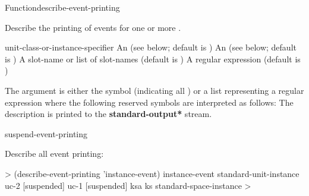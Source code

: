 \documentclass[10pt,twoside,english,pdftex]{article}
\begin{document}

\begin{functiondoc}{Function}{describe-event-printing}%
  {\nobr{[\var{event-class-specifier\/}}
    \nobr{[\var{unit-class-or-instance-specifier\/}]]}
    }
%
%


\fnsyntax

\fnpurpose Describe the printing of events for one or more
. 

\fnpackage {}

\fnmodule {}

\fnargs
\begin{args}{unit-class-or-instance-specifier}
 An  
(see below; default is )
 An 
(see below; default is )
 A slot-name or list of
slot-names (default is )
 A  regular
expression (default is \code{(*)})
\end{args}

\fndsyntax
\W\supp\tabletop
\eventclassspec
\subeventingspec
\syntaxsep
\unitclassinstancespec
\subclassingspec

\fndescription 
{}%
The  argument is either the symbol  (indicating
all ) or a list representing a regular
expression where the following reserved symbols are interpreted as
follows:
\spaceinstanceregexp
The description is printed to the {\bf *standard-output*} stream.

\begin{alsos}{suspend-event-printing}
\end{alsos}

\fnexample
Describe all event printing:
%
\W\supp
\begin{example}
  > (describe-event-printing 'instance-event)
  instance-event
    standard-unit-instance
    uc-2 [suspended]
    uc-1 [suspended]
    ksa
    ks
    standard-space-instance
  >
\end{example}

\fnnote
\instanceevfnsnyi

\end{functiondoc}
\end{document}
